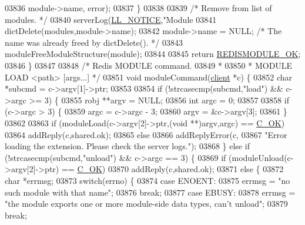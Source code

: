 \begin{DoxyCode}
{{{{{{{{{{{{{{{{{03836             module->name, error);
03837     \}
03838 
03839     \textcolor{comment}{/* Remove from list of modules. */}
03840     serverLog(\hyperlink{server_8h_a8c54c191e436c7dd3012167212692401}{LL\_NOTICE},\textcolor{stringliteral}{"Module %
03841     dictDelete(modules,module->name);
03842     module->name = NULL; \textcolor{comment}{/* The name was already freed by dictDelete(). */}
03843     moduleFreeModuleStructure(module);
03844 
03845     \textcolor{keywordflow}{return} \hyperlink{redismodule_8h_a1bc5bfd69abcd378ff52c640adc5418d}{REDISMODULE\_OK};
03846 \}
03847 
03848 \textcolor{comment}{/* Redis MODULE command.}
03849 \textcolor{comment}{ *}
03850 \textcolor{comment}{ * MODULE LOAD <path> [args...] */}
03851 \textcolor{keywordtype}{void} moduleCommand(\hyperlink{structclient}{client} *c) \{
03852     \textcolor{keywordtype}{char} *subcmd = c->argv[1]->ptr;
03853 
03854     \textcolor{keywordflow}{if} (!strcasecmp(subcmd,\textcolor{stringliteral}{"load"}) && c->argc >= 3) \{
03855         robj **argv = NULL;
03856         \textcolor{keywordtype}{int} argc = 0;
03857 
03858         \textcolor{keywordflow}{if} (c->argc > 3) \{
03859             argc = c->argc - 3;
03860             argv = &c->argv[3];
03861         \}
03862 
03863         \textcolor{keywordflow}{if} (moduleLoad(c->argv[2]->ptr,(\textcolor{keywordtype}{void} **)argv,argc) == \hyperlink{server_8h_a303769ef1065076e68731584e758d3e1}{C\_OK})
03864             addReply(c,shared.ok);
03865         \textcolor{keywordflow}{else}
03866             addReplyError(c,
03867                 \textcolor{stringliteral}{"Error loading the extension. Please check the server logs."});
03868     \} \textcolor{keywordflow}{else} \textcolor{keywordflow}{if} (!strcasecmp(subcmd,\textcolor{stringliteral}{"unload"}) && c->argc == 3) \{
03869         \textcolor{keywordflow}{if} (moduleUnload(c->argv[2]->ptr) == \hyperlink{server_8h_a303769ef1065076e68731584e758d3e1}{C\_OK})
03870             addReply(c,shared.ok);
03871         \textcolor{keywordflow}{else} \{
03872             \textcolor{keywordtype}{char} *errmsg;
03873             \textcolor{keywordflow}{switch}(errno) \{
03874             \textcolor{keywordflow}{case} ENOENT:
03875                 errmsg = \textcolor{stringliteral}{"no such module with that name"};
03876                 \textcolor{keywordflow}{break};
03877             \textcolor{keywordflow}{case} EBUSY:
03878                 errmsg = \textcolor{stringliteral}{"the module exports one or more module-side data types, can't unload"};
03879                 \textcolor{keywordflow}{break};
}}}}}}}}}}}}}}}}}}
\end{DoxyCode}
